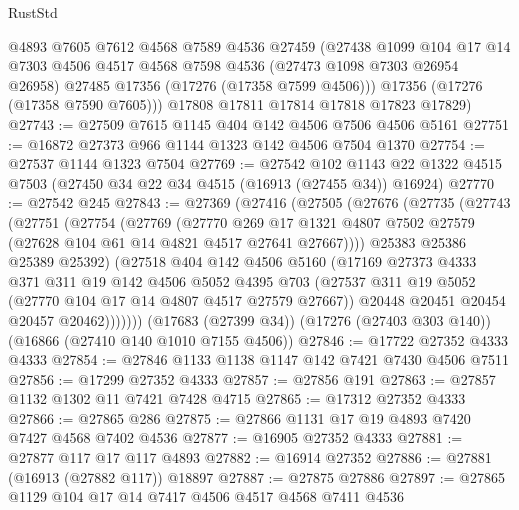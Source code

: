 \begin{lexlean}{RustStd}
\begin{coremodule}
        @4893
        @7605
        @7612
        @4568
        @7589
        @4536
        @27459
        (@27438
          @1099
          @104
          @17
          @14
          @7303
          @4506
          @4517
          @4568
          @7598
          @4536
          (@27473 @1098 @7303 @26954 @26958)
          @27485
          @17356
          (@17276 (@17358 @7599 @4506)))
        @17356
        (@17276 (@17358 @7590 @7605)))
      @17808
      @17811
      @17814
      @17818
      @17823
      @17829)
@27743 := @27509 @7615 @1145 @404 @142 @4506 @7506 @4506 @5161
@27751 := @16872 @27373 @966 @1144 @1323 @142 @4506 @7504 @1370
@27754 := @27537 @1144 @1323 @7504
@27769 := @27542
    @102
    @1143
    @22
    @1322
    @4515
    @7503
    (@27450 @34 @22 @34 @4515 (@16913 (@27455 @34)) @16924)
@27770 := @27542 @245
@27843 := @27369
    (@27416
      (@27505
        (@27676
          (@27735
            (@27743
              (@27751
                (@27754
                  (@27769
                    (@27770
                      @269
                      @17
                      @1321
                      @4807
                      @7502
                      @27579
                      (@27628 @104 @61 @14 @4821 @4517 @27641 @27667))))
                @25383
                @25386
                @25389
                @25392)
              (@27518
                @404
                @142
                @4506
                @5160
                (@17169
                  @27373
                  @4333
                  @371
                  @311
                  @19
                  @142
                  @4506
                  @5052
                  @4395
                  @703
                  (@27537 @311 @19 @5052 (@27770 @104 @17 @14 @4807 @4517 @27579 @27667))
                  @20448
                  @20451
                  @20454
                  @20457
                  @20462)))))))
    (@17683 (@27399 @34))
    (@17276 (@27403 @303 @140))
    (@16866 (@27410 @140 @1010 @7155 @4506))
@27846 := @17722 @27352 @4333 @4333
@27854 := @27846 @1133 @1138 @1147 @142 @7421 @7430 @4506 @7511
@27856 := @17299 @27352 @4333
@27857 := @27856 @191
@27863 := @27857 @1132 @1302 @11 @7421 @7428 @4715
@27865 := @17312 @27352 @4333
@27866 := @27865 @286
@27875 := @27866 @1131 @17 @19 @4893 @7420 @7427 @4568 @7402 @4536
@27877 := @16905 @27352 @4333
@27881 := @27877 @117 @17 @117 @4893
@27882 := @16914 @27352
@27886 := @27881 (@16913 (@27882 @117)) @18897
@27887 := @27875 @27886
@27897 := @27865 @1129 @104 @17 @14 @7417 @4506 @4517 @4568 @7411 @4536

\end{coremodule}
\end{lexlean}
